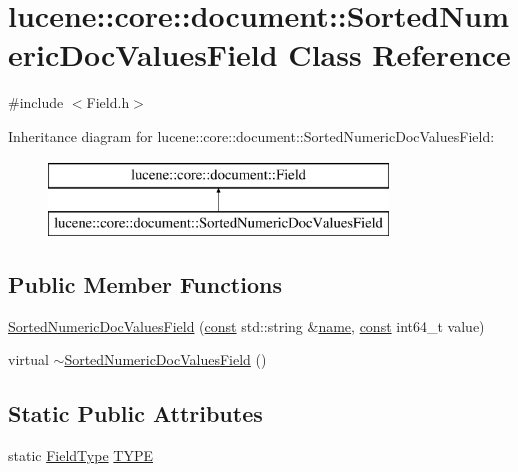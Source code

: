 \hypertarget{classlucene_1_1core_1_1document_1_1SortedNumericDocValuesField}{}\section{lucene\+:\+:core\+:\+:document\+:\+:Sorted\+Numeric\+Doc\+Values\+Field Class Reference}
\label{classlucene_1_1core_1_1document_1_1SortedNumericDocValuesField}


{\ttfamily \#include $<$Field.\+h$>$}

Inheritance diagram for lucene\+:\+:core\+:\+:document\+:\+:Sorted\+Numeric\+Doc\+Values\+Field\+:\begin{figure}[H]
\begin{center}
\leavevmode
\includegraphics[height=2.000000cm]{classlucene_1_1core_1_1document_1_1SortedNumericDocValuesField}
\end{center}
\end{figure}
\subsection*{Public Member Functions}
\begin{DoxyCompactItemize}
\item 
\mbox{\hyperlink{classlucene_1_1core_1_1document_1_1SortedNumericDocValuesField_a671e8bf15e95e893c228a4dec124f690}{Sorted\+Numeric\+Doc\+Values\+Field}} (\mbox{\hyperlink{ZlibCrc32_8h_a2c212835823e3c54a8ab6d95c652660e}{const}} std\+::string \&\mbox{\hyperlink{classlucene_1_1core_1_1document_1_1Field_a52f673f3b3abb14b180f5159f4726537}{name}}, \mbox{\hyperlink{ZlibCrc32_8h_a2c212835823e3c54a8ab6d95c652660e}{const}} int64\+\_\+t value)
\item 
virtual \mbox{\hyperlink{classlucene_1_1core_1_1document_1_1SortedNumericDocValuesField_a9e5f61fdd8fecb71c2148a896bf6ba26}{$\sim$\+Sorted\+Numeric\+Doc\+Values\+Field}} ()
\end{DoxyCompactItemize}
\subsection*{Static Public Attributes}
\begin{DoxyCompactItemize}
\item 
static \mbox{\hyperlink{classlucene_1_1core_1_1document_1_1FieldType}{Field\+Type}} \mbox{\hyperlink{classlucene_1_1core_1_1document_1_1SortedNumericDocValuesField_a65165dc2b4de45408cccb373f92a1334}{T\+Y\+PE}}
\end{DoxyCompactItemize}
